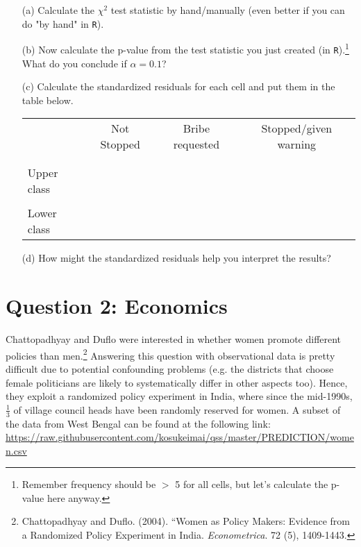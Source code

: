 \documentclass[12pt,letterpaper]{article}
\begin{document}
\begin{enumerate}
	
	\item [(a)]
	Calculate the $\chi^2$ test statistic by hand/manually (even better if you can do "by hand" in \texttt{R}).\\
	\vspace{7cm}
	
	\item [(b)]
	Now calculate the p-value from the test statistic you just created (in \texttt{R}).\footnote{Remember frequency should be $>$ 5 for all cells, but let's calculate the p-value here anyway.}  What do you conclude if $\alpha = 0.1$?\\
	
	\newpage
	\item [(c)] Calculate the standardized residuals for each cell and put them in the table below.
	\vspace{1cm}
	
	\begin{table}[h]
		\centering
		\begin{tabular}{l | c c c }
			& Not Stopped & Bribe requested & Stopped/given warning \\
			\\[-1.8ex] 
			\hline \\[-1.8ex]
			Upper class  &  &  &  \\
			\\
			Lower class &  &   &   \\
			
		\end{tabular}
	\end{table}
	
	
	\vspace{7cm}
	\item [(d)] How might the standardized residuals help you interpret the results?  
	
\end{enumerate}
\newpage

\section*{Question 2: Economics}
Chattopadhyay and Duflo were interested in whether women promote different policies than men.\footnote{Chattopadhyay and Duflo. (2004). ``Women as Policy Makers: Evidence from a Randomized Policy Experiment in India. \textit{Econometrica}. 72 (5), 1409-1443.} Answering this question with observational data is pretty difficult due to potential confounding problems (e.g. the districts that choose female politicians are likely to systematically differ in other aspects too). Hence, they exploit a randomized policy experiment in India, where since the mid-1990s, $\frac{1}{3}$ of village council heads have been randomly reserved for women. A subset of the data from West Bengal can be found at the following link: \url{https://raw.githubusercontent.com/kosukeimai/qss/master/PREDICTION/women.csv}\\
\end{document}
